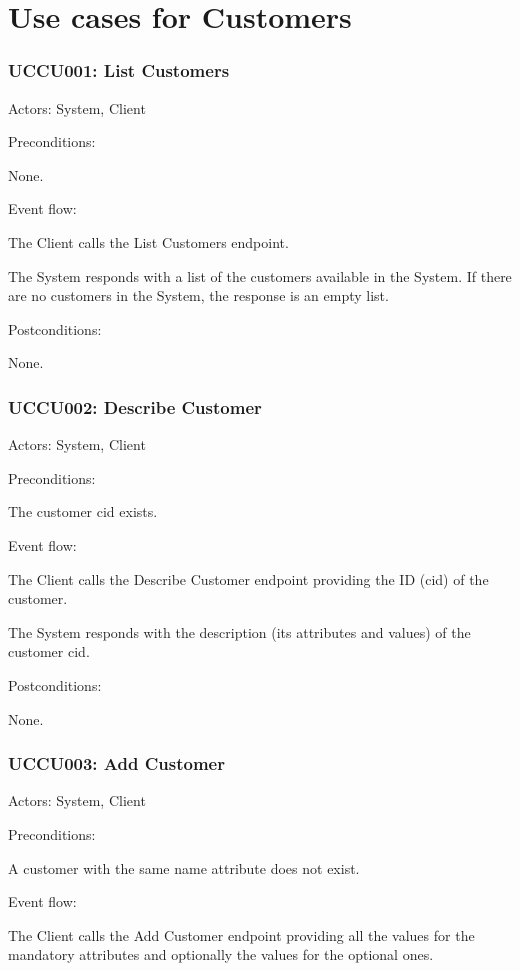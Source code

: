 \section{Use cases for Customers}

\subsubsection{UCCU001: List Customers}
\label{UCCU001}

Actors: System, Client

Preconditions: 

\ucitem None.

Event flow:

\ucitem The Client calls the List Customers endpoint.

\ucitem The System responds with a list of the customers available in the System. If there are no customers in the System, the response is an empty list.

Postconditions: 

\ucitem None.

\subsubsection{UCCU002: Describe Customer}
\label{UCCU002}

Actors: System, Client

Preconditions: 

\ucitem The customer cid exists.

Event flow:

\ucitem The Client calls the Describe Customer endpoint providing the ID (cid) of the customer.

\ucitem The System responds with the description (its attributes and values) of the customer cid.

Postconditions:

\ucitem None.

\subsubsection{UCCU003: Add Customer}
\label{UCCU003}

Actors: System, Client

Preconditions: 

\ucitem A customer with the same name attribute does not exist.

Event flow:

\ucitem The Client calls the Add Customer endpoint providing all the values for the mandatory attributes and optionally the values for the optional ones.

